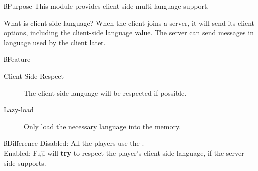 \label{sec:language}
\ss{Purpose}
This module provides client-side multi-language support.


\begin{note}{What is client-side language?}
    When the client joins a server, it will send its client options, including the client-side language value.
    The server can send messages in language used by the client later.
\end{note}


\ss{Feature}
\begin{description}
    \item[Client-Side Respect] The client-side language will be respected if possible.
    \item[Lazy-load] Only load the necessary language into the memory.
\end{description}


\ss{Difference}
Disabled: All the players use the .\\
Enabled: Fuji will \textbf{try} to respect the player's client-side language, if the server-side supports.

